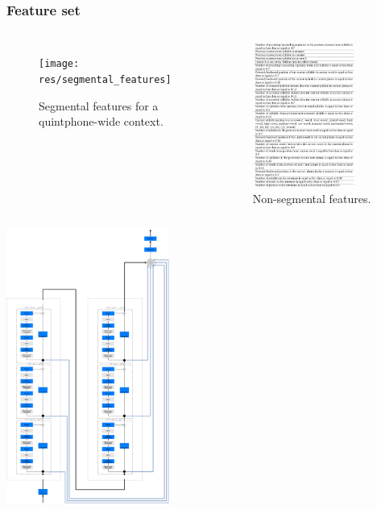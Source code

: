 \documentclass[a4paper,9pt]{beamer}
\theoremstyle{mytheoremstyle}
\begin{document}
\begin{frame}
\frametitle{Feature set}
\begin{columns}
\begin{figure}
\begin{center}
  \texttt{[image: res/segmental\_features]}
\end{center}
\caption{Segmental features for a quintphone-wide context.}
\end{figure}
\begin{figure}
\begin{center}
  \includegraphics[width=0.8\textwidth]{res/suprasegmental_features}
\end{center}
\caption{Non-segmental features.}
\end{figure}
\end{columns}
\end{frame}

\begin{frame}
\includegraphics[width=0.4\textwidth]{res/network_architecture}
\end{frame}
\end{document}
